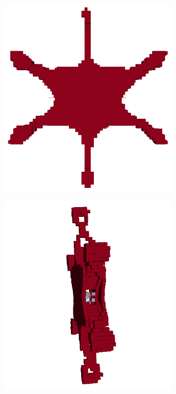 \begin{figure}
\begin{subfigure}[c]{.24\linewidth}
\end{subfigure}
\begin{subfigure}[c]{.24\linewidth}
\centering
  \includegraphics[width=\linewidth]{Pictures/TopOp/Star_Optimized4_Trans.png}
\end{subfigure}
\begin{subfigure}[c]{.24\linewidth}
\centering
  \includegraphics[width=\linewidth]{Pictures/TopOp/Star_Optimized5_Trans.png}

\end{subfigure}
\end{figure}
